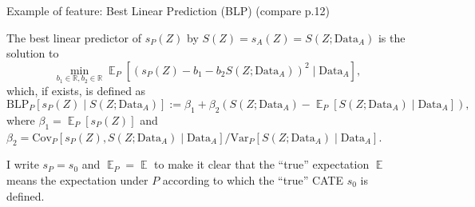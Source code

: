 \documentclass[smaller, aspectratio=169]{beamer}
\newcommand{\E}{{\ensuremath{\mathop{{\mathbb{E}}}}}}
\newcommand{\R}{\mathbb{R}}
\newcommand{\1}{\mathds{1}}
\begin{document}
\begin{frame}[label={sec:org02c277e}]{Example of feature: Best Linear Prediction (BLP) \small (compare p.12)}
\begin{definition}[BLP]
The best linear predictor of \( s_P(Z) \) by \( S(Z) = s_A(Z) = S(Z ; \text{Data}_A) \) is the
solution to
\begin{equation*}
  \min_{b_1 \in \R, b_2 \in \R} \E_P{\left[ (s_{P}(Z) - b_1 - b_2 S(Z ;
      \text{Data}_A))^2 \mid \text{Data}_A \right]},
\end{equation*}
which, if exists, is defined as
\begin{equation*}
  \text{BLP}_P[s_{P}(Z) \mid S(Z; \text{Data}_A)] := \beta_1 + \beta_2
  (S(Z; \text{Data}_A) 
  -\E_P{\left[ S(Z; \text{Data}_A) \mid \text{Data}_A \right]}),
\end{equation*}
where \( \beta_1 = \E_P{\left[ s_P(Z) \right]} \) and
\( \beta_2 = \text{Cov}_P[s_P(Z), S(Z; \text{Data}_A) \mid
\text{Data}_A]/\text{Var}_P[S(Z; \text{Data}_A) \mid \text{Data}_A]
\).
\end{definition}

\begin{block}{}
I write \(s_P = s_0\) and \(\E_P= \E\) to make it clear that the
``true'' expectation \(\E\) means the expectation under \(P\)
according to which the ``true'' CATE \(s_0\) is defined.
\end{block}
\end{frame}
\end{document}
